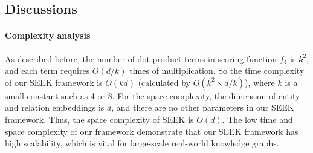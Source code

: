 \documentclass[11pt,a4paper]{article}
\begin{document}
\subsection{Discussions}
\paragraph{Complexity analysis}
As described before, the number of dot product terms in scoring function $f_4$ is $k^2$, and each term requires $O(d/k)$ times of multiplication. So the time complexity of our SEEK framework is $O(k d)$ (calculated by $O(k^2\times d/k)$), where $k$ is a small constant such as 4 or 8. For the space complexity, the dimension of entity and relation embeddings is $d$, and there are no other parameters in our SEEK framework. Thus, the space complexity of SEEK is $O(d)$. The low time and space complexity of our framework demonstrate that our SEEK framework has high scalability, which is vital for large-scale real-world knowledge graphs.
\end{document}
